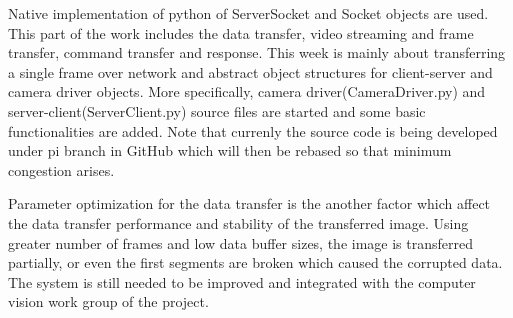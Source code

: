 Native implementation of python of ServerSocket and Socket objects are used. This part of the work includes the data transfer, video streaming and frame transfer, command transfer and response. This week is mainly about transferring a single frame over network and abstract object structures for client-server and camera driver objects. More specifically, camera driver(CameraDriver.py) and server-client(ServerClient.py) source files are started and some basic functionalities are added. Note that currenly the source code is being developed under pi branch in GitHub which will then be rebased so that minimum congestion arises.

Parameter optimization for the data transfer is the another factor which affect the data transfer performance and stability of the transferred image. Using greater number of frames and low data buffer sizes, the image is transferred partially, or even the first segments are broken which caused the corrupted data. The system is still needed to be improved and integrated with the computer vision work group of the project.